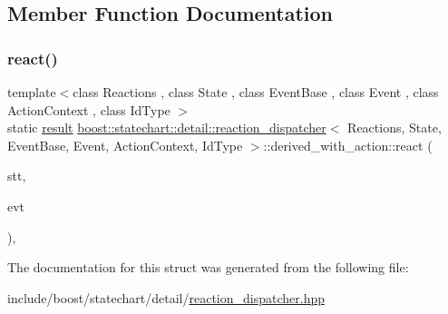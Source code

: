 \subsection{Member Function Documentation}
\mbox{\label{structboost_1_1statechart_1_1detail_1_1reaction__dispatcher_1_1derived__with__action_a8c48c84fe8d00b7850d347d539733e0d}} 
\subsubsection{\texorpdfstring{react()}{react()}}
{\footnotesize\ttfamily template$<$class Reactions , class State , class Event\+Base , class Event , class Action\+Context , class Id\+Type $>$ \\
static \mbox{\hyperlink{namespaceboost_1_1statechart_abe807f6598b614d6d87bb951ecd92331}{result}} \mbox{\hyperlink{classboost_1_1statechart_1_1detail_1_1reaction__dispatcher}{boost\+::statechart\+::detail\+::reaction\+\_\+dispatcher}}$<$ Reactions, State, Event\+Base, Event, Action\+Context, Id\+Type $>$\+::derived\+\_\+with\+\_\+action\+::react (\begin{DoxyParamCaption}\item[{State \&}]{stt,  }\item[{const Event\+Base \&}]{evt }\end{DoxyParamCaption})\hspace{0.3cm}{\ttfamily [inline]}, {\ttfamily [static]}}



The documentation for this struct was generated from the following file\+:\begin{DoxyCompactItemize}
\item 
include/boost/statechart/detail/\mbox{\hyperlink{reaction__dispatcher_8hpp}{reaction\+\_\+dispatcher.\+hpp}}\end{DoxyCompactItemize}
